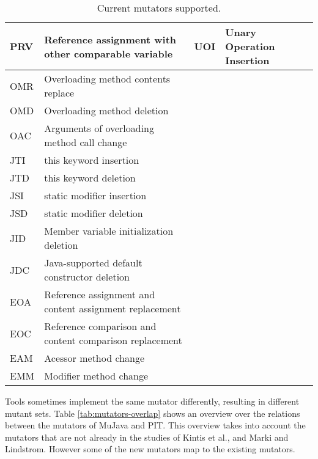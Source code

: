 \documentclass[../main]{subfiles}
\begin{document}
\begin{table}[htb]
\begin{tabular}{|l|l|l|l|}
PRV & Reference assignment   with other comparable variable     & UOI                   & Unary Operation Insertion       \\ \hline
OMR & Overloading method   contents replace                     & \multicolumn{1}{l|}{} &                                 \\ \hline
OMD & Overloading method   deletion                             & \multicolumn{1}{l|}{} &                                 \\ \hline
OAC & Arguments of   overloading method call change             & \multicolumn{1}{l|}{} &                                 \\ \hline
JTI & this keyword insertion                                    & \multicolumn{1}{l|}{} &                                 \\ \hline
JTD & this keyword deletion                                     & \multicolumn{1}{l|}{} &                                 \\ \hline
JSI & static modifier   insertion                               & \multicolumn{1}{l|}{} &                                 \\ \hline
JSD & static modifier   deletion                                & \multicolumn{1}{l|}{} &                                 \\ \hline
JID & Member variable   initialization deletion                 & \multicolumn{1}{l|}{} &                                 \\ \hline
JDC & Java-supported default   constructor deletion             & \multicolumn{1}{l|}{} &                                 \\ \hline
EOA & Reference assignment   and content assignment replacement & \multicolumn{1}{l|}{} &                                 \\ \hline
EOC & Reference comparison   and content comparison replacement & \multicolumn{1}{l|}{} &                                 \\ \hline
EAM & Acessor method change                                     & \multicolumn{1}{l|}{} &                                 \\ \hline
EMM & Modifier method change                                    & \multicolumn{1}{l|}{} &                                 \\ \hline
\end{tabular}
\caption{\label{tab:mutators-current}Current mutators supported.}
\end{table}
\newpage
Tools sometimes implement the same mutator differently, resulting in different mutant sets. Table \ref{tab:mutators-overlap} shows an overview over the relations between the mutators of MuJava and PIT. This overview takes into account the mutators that are not already in the studies of Kintis et al., and Marki and Lindstrom. However some of the new mutators map to the existing mutators.
\end{document}
